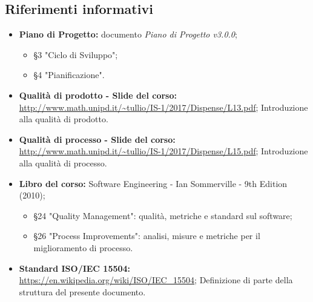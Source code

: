 \documentclass[openany,12pt,a4paper]{report}
\begin{document}
    \subsection*{Riferimenti informativi}
    
    \begin{itemize}
        \item \textbf{Piano di Progetto:} documento \textit{Piano di Progetto v3.0.0};
	        \begin{itemize}
	        	\item §3 "Ciclo di Sviluppo";
	        	\item §4 "Pianificazione".
	        \end{itemize}
        
        \item \textbf{Qualità di prodotto - Slide del corso:} 
        \\ \url{http://www.math.unipd.it/~tullio/IS-1/2017/Dispense/L13.pdf};
        	\subitem Introduzione alla qualità di prodotto.
        
        \item \textbf{Qualità di processo - Slide del corso:} \\ \url{http://www.math.unipd.it/~tullio/IS-1/2017/Dispense/L15.pdf};
        	\subitem Introduzione alla qualità di processo.
        
        \item \textbf{Libro del corso:} Software Engineering - Ian Sommerville - 9th Edition (2010);
        	\begin{itemize}
        		\item §24 "Quality Management": qualità, metriche e standard sul software;
        		\item §26 "Process Improvements": analisi, misure e metriche per il miglioramento di processo.
        	\end{itemize}
        
        \item \textbf{Standard ISO/IEC 15504:} 
        \\ \url{https://en.wikipedia.org/wiki/ISO/IEC_15504};
        	\subitem Definizione di parte della struttura del presente documento.
        

\end{itemize}
\end{document}
